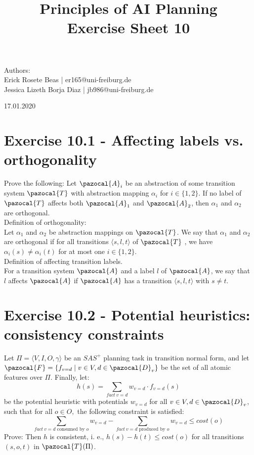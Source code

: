 \documentclass[11pt,a4paper]{article}
\title{\textbf{Principles of AI Planning
		\\{\Large Exercise Sheet 10}}}
\begin{document}
\begin{flushleft}
	Authors:\\
	Erick Rosete Beas | er165@uni-freiburg.de\\
	Jessica Lizeth Borja Diaz | jb986@uni-freiburg.de\\
\end{flushleft}
{\let\newpage\relax\maketitle}
\begin{center} 
	\large 17.01.2020
\end{center}


\section*{Exercise 10.1 - Affecting labels vs. orthogonality}
Prove the following: Let $\pazocal{A}_i$ be an abstraction of some transition system $\pazocal{T}$ with abstraction mapping $\alpha_i$ for $i \in \{1, 2\}$. If no label of $\pazocal{T}$ affects both $\pazocal{A}_1$ and $\pazocal{A}_2$, then $\alpha_1$ and $\alpha_2$ are orthogonal.\\
Definition of orthogonality:\\
Let $\alpha_1$ and $\alpha_2$ be abstraction mappings on $\pazocal{T}$.
We say that $\alpha_1$ and $\alpha_2$ are orthogonal if for all transitions
$\langle s, l, t \rangle$ of $\pazocal{T}$ , we have $\alpha_i(s) \neq \alpha_i(t)$  for at most one $i \in \{1,2\}$.\\
Definition of affecting transition labels.\\
For a transition system $\pazocal{A}$ and a label $l$ of $\pazocal{A}$, we say that $l$ affects $\pazocal{A}$ if $\pazocal{A}$ has a transition $\langle s, l, t \rangle$ with $s \neq t$.\\
\pagebreak
\section*{Exercise 10.2 - Potential heuristics: consistency constraints}
Let $\Pi = \langle V, I, O, \gamma \rangle$ be an $SAS^+$ planning task in transition normal form, and let $\pazocal{F} = \{f_{v=d} \mid v \in V, d \in \pazocal{D}_v\}$ be the set of all atomic features over $\Pi$. Finally, let:
\[h(s) = \sum_{fact\:v=d} w_{v=d} \cdot f_{v=d}(s) \]
be the potential heuristic with potentials $w_{v=d}$ for all $v \in V , d \in \pazocal{D}_v$, such that for all $o \in O,$ the following constraint is satisfied:
\[\sum_{fact\:v=d \text{ consumed by } o} w_{v=d} - \sum_{fact\:v=d \text{ produced by } o} w_{v=d} \leq cost(o)\]
Prove: Then $h$ is consistent, i. e., $h(s) - h(t) \leq cost(o)$ for all transitions $(s, o, t)$ in $\pazocal{T}(\Pi)$.
\end{document}

